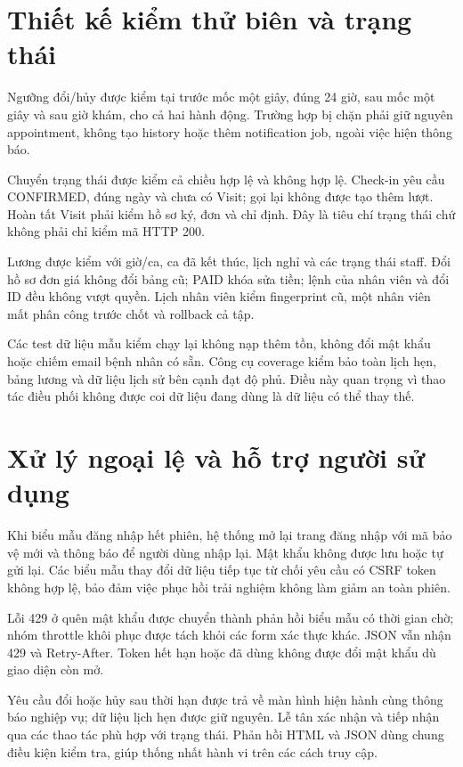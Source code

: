 \section{Thiết kế kiểm thử biên và trạng thái}
Ngưỡng đổi/\allowbreak{}hủy được kiểm tại trước mốc một giây, đúng 24 giờ, sau mốc một giây và sau giờ khám, cho cả hai hành động.\allowbreak{} Trường hợp bị chặn phải giữ nguyên appointment, không tạo history hoặc thêm notification job, ngoài việc hiện thông báo.\allowbreak{}

Chuyển trạng thái được kiểm cả chiều hợp lệ và không hợp lệ.\allowbreak{} Check-in yêu cầu CONFIRMED, đúng ngày và chưa có Visit; gọi lại không được tạo thêm lượt.\allowbreak{} Hoàn tất Visit phải kiểm hồ sơ ký, đơn và chỉ định.\allowbreak{} Đây là tiêu chí trạng thái chứ không phải chỉ kiểm mã HTTP 200.\allowbreak{}

Lương được kiểm với giờ/\allowbreak{}ca, ca đã kết thúc, lịch nghỉ và các trạng thái staff.\allowbreak{} Đổi hồ sơ đơn giá không đổi bảng cũ; PAID khóa sửa tiền; lệnh của nhân viên và đổi ID đều không vượt quyền.\allowbreak{} Lịch nhân viên kiểm fingerprint cũ, một nhân viên mất phân công trước chốt và rollback cả tập.\allowbreak{}

Các test dữ liệu mẫu kiểm chạy lại không nạp thêm tồn, không đổi mật khẩu hoặc chiếm email bệnh nhân có sẵn.\allowbreak{} Công cụ coverage kiểm bảo toàn lịch hẹn, bảng lương và dữ liệu lịch sử bên cạnh đạt độ phủ.\allowbreak{} Điều này quan trọng vì thao tác điều phối không được coi dữ liệu đang dùng là dữ liệu có thể thay thế.\allowbreak{}


\section{Xử lý ngoại lệ và hỗ trợ người sử dụng}
Khi biểu mẫu đăng nhập hết phiên, hệ thống mở lại trang đăng nhập với mã bảo vệ mới và thông báo để người dùng nhập lại.\allowbreak{} Mật khẩu không được lưu hoặc tự gửi lại.\allowbreak{} Các biểu mẫu thay đổi dữ liệu tiếp tục từ chối yêu cầu có CSRF token không hợp lệ, bảo đảm việc phục hồi trải nghiệm không làm giảm an toàn phiên.\allowbreak{}

Lỗi 429 ở quên mật khẩu được chuyển thành phản hồi biểu mẫu có thời gian chờ; nhóm throttle khôi phục được tách khỏi các form xác thực khác.\allowbreak{} JSON vẫn nhận 429 và Retry-After.\allowbreak{} Token hết hạn hoặc đã dùng không được đổi mật khẩu dù giao diện còn mở.\allowbreak{}

Yêu cầu đổi hoặc hủy sau thời hạn được trả về màn hình hiện hành cùng thông báo nghiệp vụ; dữ liệu lịch hẹn được giữ nguyên.\allowbreak{} Lễ tân xác nhận và tiếp nhận qua các thao tác phù hợp với trạng thái.\allowbreak{} Phản hồi HTML và JSON dùng chung điều kiện kiểm tra, giúp thống nhất hành vi trên các cách truy cập.\allowbreak{}

